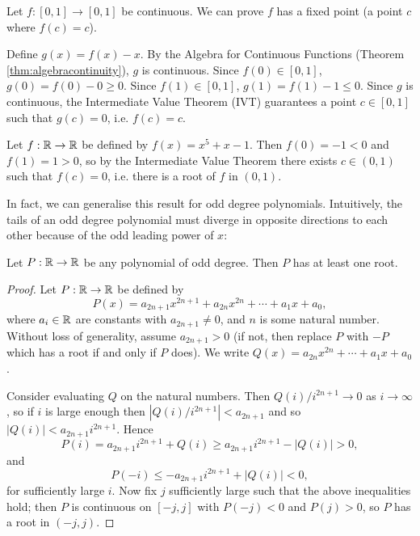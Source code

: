 \documentclass[../analysis1.tex]{subfiles}
\begin{document}
\begin{example}
     Let $f:[0,1]\to[0,1]$ be continuous. We can prove $f$ has a fixed point (a point $c$ where $f(c) = c$).
     
     Define $g(x) = f(x) - x$. By the Algebra for Continuous Functions (Theorem \ref{thm:algebracontinuity}), $g$ is continuous. Since $f(0) \in [0,1]$, $g(0) = f(0) - 0 \ge 0$. Since $f(1) \in [0,1]$, $g(1) = f(1) - 1 \le 0$. Since $g$ is continuous, the Intermediate Value Theorem (IVT) guarantees a point $c \in [0,1]$ such that $g(c) = 0$, i.e. $f(c) = c$.
\end{example}

\begin{example}
    Let $f:\mathbb{R}\to\mathbb{R}$ be defined by $f(x)=x^5+x-1$. Then $f(0)=-1<0$ and $f(1)=1>0$, so by the Intermediate Value Theorem there exists $c\in(0,1)$ such that $f(c)=0$, i.e. there is a root of $f$ in $(0,1)$.
\end{example}
In fact, we can generalise this result for odd degree polynomials. Intuitively, the tails of an odd degree polynomial must diverge in opposite directions to each other because of the odd leading power of $x$:
\begin{center}
\end{center}

\begin{corollary}
    \begin{shaded*}
        Let $P:\mathbb{R}\to\mathbb{R}$ be any polynomial of odd degree. Then $P$ has at least one root.
    \end{shaded*}
\end{corollary}
\begin{proof}
    Let $P:\mathbb{R}\to\mathbb{R}$ be defined by \[P(x)=a_{2n+1}x^{2n+1}+a_{2n}x^{2n}+\cdots+a_{1}x+a_0,\]
    where $a_i\in\mathbb{R}$ are constants with $a_{2n+1}\ne 0$, and $n$ is some natural number. Without loss of generality, assume $a_{2n+1}>0$ (if not, then replace $P$ with $-P$ which has a root if and only if $P$ does). We write $Q(x)=a_{2n}x^{2n}+\cdots+a_1x+a_0$.\par
    Consider evaluating $Q$ on the natural numbers. Then $Q(i)/i^{2n+1}\to 0$ as $i\to\infty$, so if $i$ is large enough then $|Q(i)/i^{2n+1}|<a_{2n+1}$ and so $|Q(i)|<a_{2n+1}i^{2n+1}$. Hence
    \[P(i)=a_{2n+1}i^{2n+1}+Q(i)\ge a_{2n+1}i^{2n+1}-|Q(i)| > 0,\]
    and
    \[P(-i)\le -a_{2n+1}i^{2n+1}+|Q(i)|<0,\]for sufficiently large $i$. Now fix $j$ sufficiently large such that the above inequalities hold; then $P$ is continuous on $[-j,j]$ with $P(-j)<0$ and $P(j)>0$, so $P$ has a root in $(-j,j)$. \qedhere
\end{proof}
\end{document}
